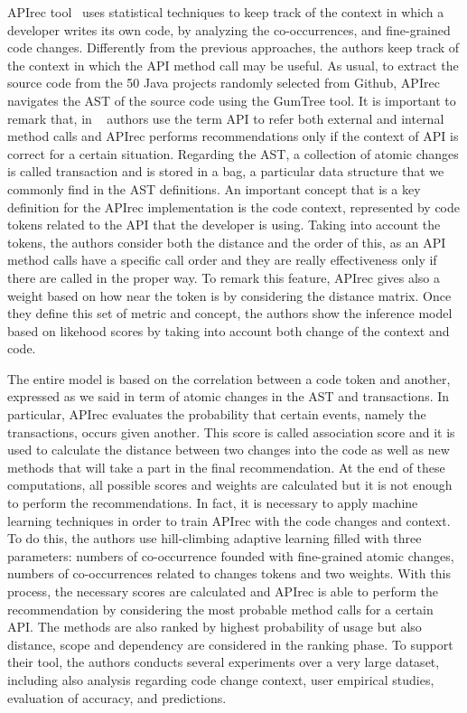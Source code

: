 APIrec tool~\cite{nguyen_api_2016} uses statistical techniques to keep track of 
the context in which a developer writes its own code, by analyzing the 
co-occurrences, and fine-grained code changes. Differently from the previous 
approaches, the authors keep track of the context in which the API method call 
may be useful. As usual, to extract the source code from the 50 Java projects 
randomly selected from Github, APIrec navigates the AST of the source code 
using the GumTree tool. It is important to remark that, in 
~\cite{nguyen_api_2016} authors use the term API to refer both external and 
internal method calls and APIrec performs recommendations only if the context 
of API is correct for a certain situation. Regarding the AST, a collection of 
atomic changes is called transaction and is stored in a bag, a particular data 
structure that we commonly find in the AST definitions. An important concept 
that is a key definition for the APIrec implementation is the code context, 
represented by code tokens related to the API that the developer is using. 
Taking into account the tokens, the authors consider both the distance and the 
order of this, as an API method calls have a specific call order and they are 
really effectiveness only if there are called in the proper way. To remark this 
feature, APIrec gives also a weight based on how near the token is by 
considering the distance matrix. Once they define this set of metric and 
concept, the authors show the inference model based on likehood scores by 
taking into account both change of the context and code.

The entire model is based on the correlation between a code token and another, 
expressed as we said in term of atomic changes in the AST and transactions. In 
particular, APIrec evaluates the probability that certain events, namely the 
transactions, occurs given another. This score is called association score and 
it is used to calculate the distance between two changes into the code as well 
as new methods that will take a part in the final recommendation. At the end of 
these computations, all possible scores and weights are calculated but it is 
not enough to perform the recommendations. In fact, it is necessary to apply 
machine learning techniques in order to train APIrec with the code changes and 
context. To do this, the authors use hill-climbing adaptive learning filled 
with three parameters: numbers of co-occurrence founded with fine-grained 
atomic changes, numbers of co-occurrences related to changes tokens and two 
weights. With this process, the necessary scores are calculated and APIrec is 
able to perform the recommendation by considering the most probable method 
calls for a certain API. The methods are also ranked by highest probability of 
usage but also distance, scope and dependency are considered in the ranking 
phase. To support their tool, the authors conducts several experiments over a 
very large dataset, including also analysis regarding code change context, user 
empirical studies, evaluation of accuracy, and predictions.



